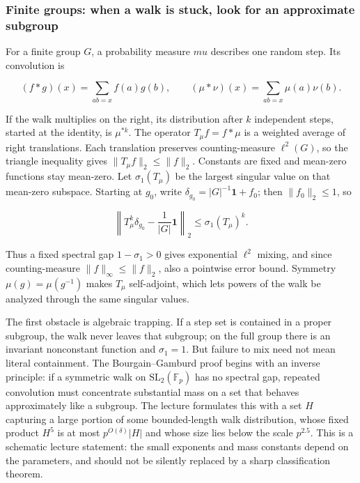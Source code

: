 \subsubsection{Finite groups: when a walk is stuck, look for an approximate subgroup}\label{04-visual-computing-ii-ch033-finite-groups-when-a-walk-is-stuck-look-for-an-approximate-subgroup}

For a finite group \(G\), a probability measure \(mu\) describes one random step. Its convolution is

\[ (f*g)(x)=\sum_{ab=x}f(a)g(b),\qquad (\mu*\nu)(x)=\sum_{ab=x}\mu(a)\nu(b). \]

If the walk multiplies on the right, its distribution after \(k\) independent steps, started at the identity, is \(\mu^{*k}\). The operator \(T_\mu f=f*\mu\) is a weighted average of right translations. Each translation preserves counting-measure \(\ell^2(G)\), so the triangle inequality gives \(\|T_\mu f\|_2\leq\|f\|_2\). Constants are fixed and mean-zero functions stay mean-zero. Let \(\sigma_1(T_\mu)\) be the largest singular value on that mean-zero subspace. Starting at \(g_0\), write \(\delta_{g_0}=|G|^{-1}\mathbf 1+f_0\); then \(\|f_0\|_2\leq1\), so

\[ \left\|T_\mu^k\delta_{g_0}-\frac{1}{|G|}\mathbf 1\right\|_2\leq \sigma_1(T_\mu)^k. \]

Thus a fixed spectral gap \(1-\sigma_1>0\) gives exponential \(\ell^2\) mixing, and since counting-measure \(\|f\|_\infty\leq\|f\|_2\), also a pointwise error bound. Symmetry \(\mu(g)=\mu(g^{-1})\) makes \(T_\mu\) self-adjoint, which lets powers of the walk be analyzed through the same singular values.

The first obstacle is algebraic trapping. If a step set is contained in a proper subgroup, the walk never leaves that subgroup; on the full group there is an invariant nonconstant function and \(\sigma_1=1\). But failure to mix need not mean literal containment. The Bourgain--Gamburd proof begins with an inverse principle: if a symmetric walk on \(\mathrm{SL}_2(\mathbb F_p)\) has no spectral gap, repeated convolution must concentrate substantial mass on a set that behaves approximately like a subgroup. The lecture formulates this with a set \(H\) capturing a large portion of some bounded-length walk distribution, whose fixed product \(H^5\) is at most \(p^{O(\delta)}|H|\) and whose size lies below the scale \(p^{2.5}\). This is a schematic lecture statement: the small exponents and mass constants depend on the parameters, and should not be silently replaced by a sharp classification theorem.

